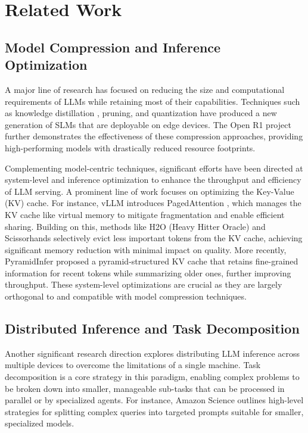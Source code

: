 \section{Related Work}
\subsection{Model Compression and Inference Optimization}
A major line of research has focused on reducing the size and computational requirements of LLMs while retaining most of their capabilities. Techniques such as knowledge distillation \cite{DeepSeek-RL}, pruning, and quantization have produced a new generation of SLMs that are deployable on edge devices. The Open R1 project \cite{HuggingFace2024OpenR1} further demonstrates the effectiveness of these compression approaches, providing high-performing models with drastically reduced resource footprints.

Complementing model-centric techniques, significant efforts have been directed at system-level and inference optimization to enhance the throughput and efficiency of LLM serving. A prominent line of work focuses on optimizing the Key-Value (KV) cache. For instance, vLLM introduces PagedAttention \cite{Kwon2023PagedAttention}, which manages the KV cache like virtual memory to mitigate fragmentation and enable efficient sharing. Building on this, methods like H2O (Heavy Hitter Oracle) \cite{Zhang2023H2O} and Scissorhands \cite{Liu2023Scissorhands} selectively evict less important tokens from the KV cache, achieving significant memory reduction with minimal impact on quality. More recently, PyramidInfer \cite{Zhang2024PyramidInfer} proposed a pyramid-structured KV cache that retains fine-grained information for recent tokens while summarizing older ones, further improving throughput. These system-level optimizations are crucial as they are largely orthogonal to and compatible with model compression techniques.

\subsection{Distributed Inference and Task Decomposition}
Another significant research direction explores distributing LLM inference across multiple devices to overcome the limitations of a single machine. Task decomposition is a core strategy in this paradigm, enabling complex problems to be broken down into smaller, manageable sub-tasks that can be processed in parallel or by specialized agents. For instance, Amazon Science outlines high-level strategies for splitting complex queries into targeted prompts suitable for smaller, specialized models.

